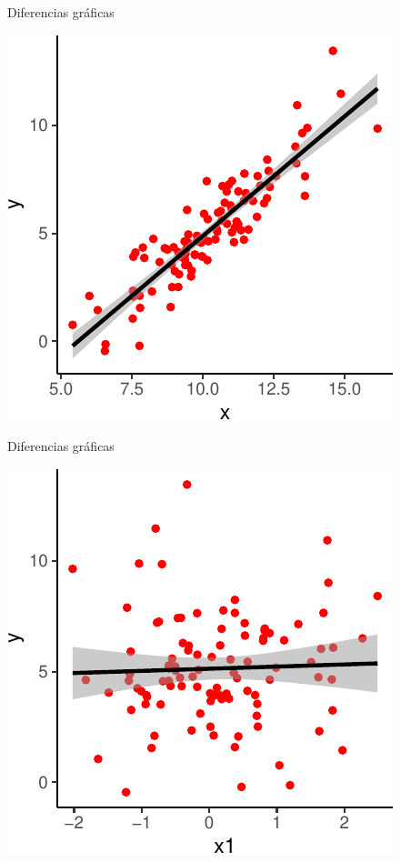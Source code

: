 \documentclass[
  11pt,
  ignorenonframetext,
]{beamer}
\begin{document}
\begin{frame}{Diferencias gráficas}
\protect\hypertarget{diferencias-gruxe1ficas-2}{}
\begin{center}\includegraphics{Regresion_files/figure-beamer/unnamed-chunk-3-1} \end{center}
\end{frame}

\begin{frame}{Diferencias gráficas}
\protect\hypertarget{diferencias-gruxe1ficas-3}{}
\begin{center}\includegraphics{Regresion_files/figure-beamer/unnamed-chunk-4-1} \end{center}
\end{frame}
\end{document}
